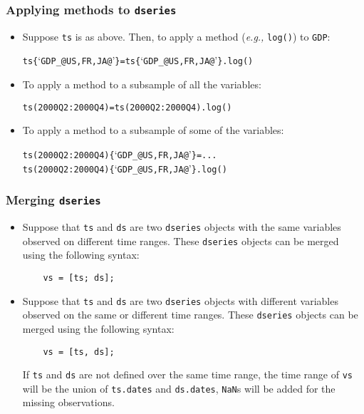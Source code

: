 \documentclass[10pt]{beamer}
\newcommand{\myitem}{\item[$\bullet$]}
\begin{document}
\begin{frame}[fragile,t]
  \frametitle{Applying methods to \texttt{dseries}}
  \begin{itemize}
    \myitem Suppose \texttt{ts} is as above. Then, to apply a method
    (\textit{e.g.,} \texttt{log()}) to \texttt{GDP}:
    \begin{alltt}
  ts\{`GDP_@US,FR,JA@'\}=ts\{`GDP_@US,FR,JA@'\}.log()
    \end{alltt}
    \myitem To apply a method to a subsample of all the variables:
    \begin{alltt}
  ts(2000Q2:2000Q4) = ts(2000Q2:2000Q4).log()
    \end{alltt}
    \myitem To apply a method to a subsample of some of the variables:
    \begin{alltt}
  ts(2000Q2:2000Q4)\{`GDP_@US,FR,JA@'\} = ...
    ts(2000Q2:2000Q4)\{`GDP_@US,FR,JA@'\}.log()
    \end{alltt}
  \end{itemize}
\end{frame}


\begin{frame}[fragile,t]
  \frametitle{Merging \texttt{dseries}}
  \begin{itemize}
    \myitem Suppose that \verb+ts+ and \verb+ds+ are two \texttt{dseries} objects
    with the same variables observed on different time ranges. These
    \texttt{dseries} objects can be merged using the following syntax:
\begin{verbatim}
    vs = [ts; ds];
\end{verbatim}
\myitem Suppose that \verb+ts+ and \verb+ds+ are two \texttt{dseries} objects
with different variables observed on the same or different time ranges. These
\texttt{dseries} objects can be merged using the following syntax:
\begin{verbatim}
    vs = [ts, ds];
\end{verbatim}
If \verb+ts+ and \verb+ds+ are not defined over the same time range,
the time range of \verb+vs+ will be the union of \verb+ts.dates+ and
\verb+ds.dates+, \verb+NaN+s will be added for the missing observations.
  \end{itemize}
\end{frame}
\end{document}

